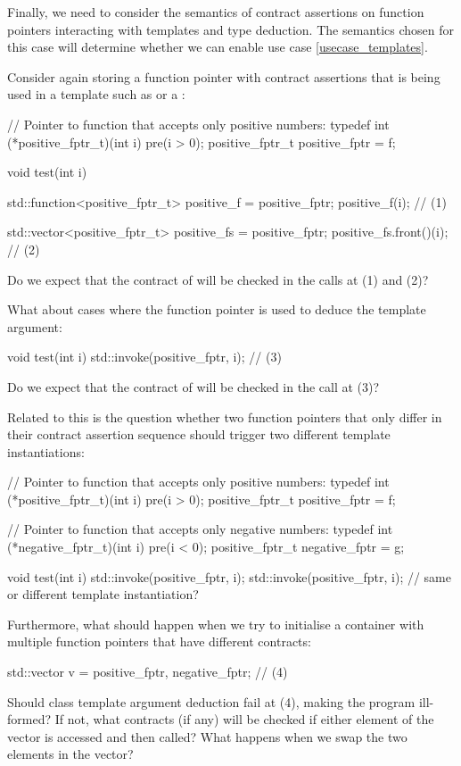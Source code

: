 Finally, we need to consider the semantics of contract assertions on function pointers interacting with templates and type deduction. The semantics chosen for this case will determine whether we can enable use case \ref{usecase_templates}.

Consider again storing a function pointer with contract assertions that is being used in a template such as  or a :
\begin{codeblock}
// Pointer to function that accepts only positive numbers:
typedef int (*positive_fptr_t)(int i) pre(i > 0);
positive_fptr_t positive_fptr = f;

void test(int i) {
  std::function<positive_fptr_t> positive_f = positive_fptr;
  positive_f(i);  // (1)
  
  std::vector<positive_fptr_t> positive_fs = {positive_fptr};
  positive_fs.front()(i);  // (2)
}
\end{codeblock}
Do we expect that the contract of  will be checked in the calls at (1) and (2)?

What about cases where the function pointer is used to deduce the template argument:
\begin{codeblock}
void test(int i) {
  std::invoke(positive_fptr, i);  // (3)
}
\end{codeblock}
Do we expect that the contract of  will be checked in the call at (3)?

Related to this is the question whether two function pointers that only differ in their contract assertion sequence should trigger two different template instantiations:
\begin{codeblock}
// Pointer to function that accepts only positive numbers:
typedef int (*positive_fptr_t)(int i) pre(i > 0);
positive_fptr_t positive_fptr = f;

// Pointer to function that accepts only negative numbers:
typedef int (*negative_fptr_t)(int i) pre(i < 0);
positive_fptr_t negative_fptr = g;

void test(int i) {
  std::invoke(positive_fptr, i);
  std::invoke(positive_fptr, i);  // same or different template instantiation?
}
\end{codeblock}
Furthermore, what should happen when we try to initialise a container with multiple function pointers that have different contracts:
\begin{codeblock}
std::vector v = {positive_fptr, negative_fptr};  // (4)
\end{codeblock}
Should class template argument deduction fail at (4), making the program ill-formed? If not, what contracts (if any) will be checked if either element of the vector is accessed and then called? What happens when we swap the two elements in the vector?

